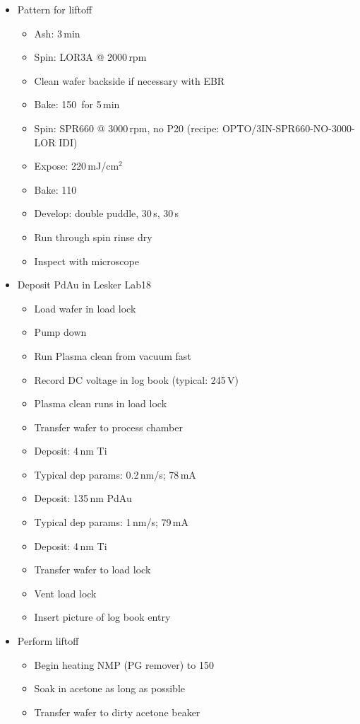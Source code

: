 \begin{itemize}
\item Pattern for liftoff
\begin{itemize}
\item Ash: 3\,min
\item Spin: LOR3A @ 2000\,rpm
\item Clean wafer backside if necessary with EBR
\item Bake: 150\,\textcelsius\,\,for 5\,min
\item Spin: SPR660 @ 3000\,rpm, no P20 (recipe: OPTO/3IN-SPR660-NO-3000-LOR IDI)
\item Expose: 220\,mJ/cm$^2$
\item Bake: 110\,\textcelsius\
\item Develop: double puddle, 30\,s, 30\,s
\item Run through spin rinse dry
\item Inspect with microscope
\end{itemize}
\item Deposit PdAu in Lesker Lab18
\begin{itemize}
\item Load wafer in load lock
\item Pump down
\item Run Plasma clean from vacuum fast
\item Record DC voltage in log book (typical: 245\,V)
\item Plasma clean runs in load lock
\item Transfer wafer to process chamber
\item Deposit: 4\,nm Ti
\item Typical dep params: 0.2\,nm/s; 78\,mA
\item Deposit: 135\,nm PdAu
\item Typical dep params: 1\,nm/s; 79\,mA
\item Deposit: 4\,nm Ti
\item Transfer wafer to load lock
\item Vent load lock
\item Insert picture of log book entry
\end{itemize}
\item Perform liftoff
\begin{itemize}
\item Begin heating NMP (PG remover) to 150\textcelsius
\item Soak in acetone as long as possible
\item Transfer wafer to dirty acetone beaker

\end{itemize}
\end{itemize}
